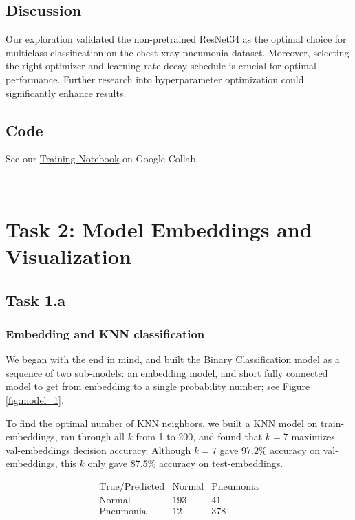 \documentclass{article}
\begin{document}
\subsection{Discussion}
Our exploration validated the non-pretrained ResNet34 as the optimal choice for multiclass classification on the chest-xray-pneumonia dataset. Moreover, selecting the right optimizer and learning rate decay schedule is crucial for optimal performance. Further research into hyperparameter optimization could significantly enhance results.

\subsection{Code}

See our \href{https://colab.research.google.com/drive/1Tn58ilSmOiaNIyFNw5BHlqye3YQIMplX#scrollTo=fSeq-k2n1jHI}{Training Notebook} on Google Collab.


\
\section{Task 2: Model Embeddings and Visualization}

\subsection{Task 1.a}
\subsubsection{Embedding and KNN classification}
We began with the end in mind, and built the Binary Classification model as a sequence of two sub-models: an embedding model, and short fully connected model to get from embedding to a single probability number; see Figure \ref{fig:model_1}.

To find the optimal number of KNN neighbors, we built a KNN model on train-embeddings, ran through all $k$ from 1 to 200, and found that $k = 7$ maximizes val-embeddings decision accuracy. Although $k = 7$ gave 97.2\% accuracy on val-embeddings, this $k$ only gave 87.5\% accuracy on test-embeddings.

\[
\begin{array}{c|cccc}
\text{True/Predicted} & \text{Normal} & \text{Pneumonia} \\
\hline
\text{Normal} & 193 & 41 \\
\text{Pneumonia} & 12 & 378 \\
\end{array}
\]
\end{document}
